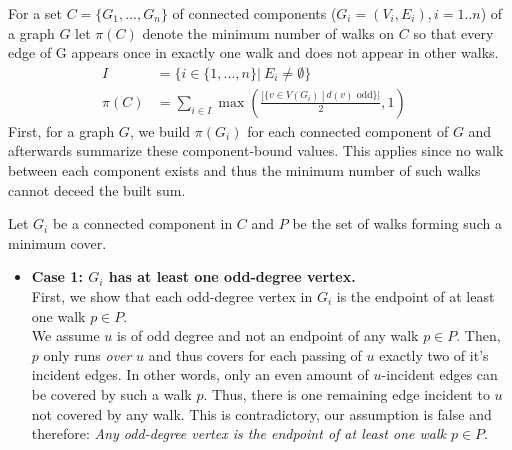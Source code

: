 \documentclass[a4paper]{article}
\begin{document}
	\begin{solution}{7}
		\begin{theorem}{
		For a set $C = \{G_1, ..., G_n\}$ of connected components ($G_i = (V_i, E_i), i = 1..n$) of a graph $G$ let $\pi(C)$ denote the minimum number of walks on $C$ so that every edge of G appears once in exactly one walk and does not appear in other walks.\\
		\begin{align}
			I&=\{i \in \{1,...,n\} |\ E_i \neq \emptyset\}&\\
			\pi(C)&= \sum_{i \in I} \max(\frac{|\{v \in V(G_i)\ |\ d(v) \text{ odd}\}|}{2}, 1)&
		\end{align}}			
			First, for a graph $G$, we build $\pi(G_i)$ for each connected component of $G$ and afterwards summarize these component-bound values. This applies since no walk between each component exists and thus the minimum number of such walks cannot deceed the built sum.

			Let $G_i$ be a connected component in $C$ and $P$ be the set of walks forming such a minimum cover.
			
			\begin{itemize}
				\item \textbf{Case 1: $G_i$ has at least one odd-degree vertex.}\\
					First, we show that each odd-degree vertex in $G_i$ is the endpoint of at least one walk $p \in P$.\\

					We assume $u$ is of odd degree and not an endpoint of any walk $p \in P$.
					Then, $p$ only runs \emph{over} $u$ and thus covers  for each passing of $u$ exactly two of it's incident edges.  In other words, only an even amount of $u$-incident edges can be covered by such a walk $p$.
					Thus, there is one remaining edge incident to $u$ not covered by any walk. This is contradictory, our assumption is false and therefore: \emph{Any odd-degree vertex is the endpoint of at least one walk $p \in P$}.\\
			

\end{itemize}
\end{theorem}
\end{solution}
\end{document}
